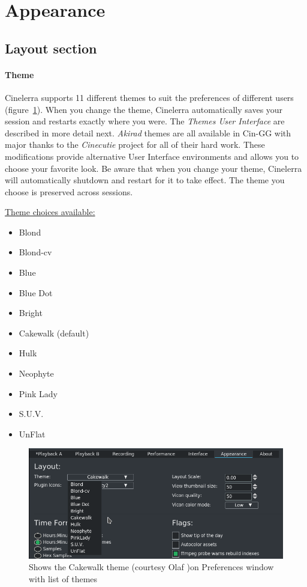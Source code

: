 \section{Appearance}%
\label{sec:appearance}

\subsection{Layout section}%
\label{sub:layout_section}

\paragraph{Theme} Cinelerra supports 11 different themes to suit the preferences of different users (figure~\ref{fig:theme}).  When you change the theme, Cinelerra automatically saves your session and restarts exactly where you were.  The \textit{Themes User Interface} are described in more detail next.  \textit{Akirad} themes are all available in Cin-GG with major thanks to the \textit{Cinecutie} project for all of their hard work. These modifications provide alternative User Interface environments and allows you to choose your favorite look.  Be aware that when you change your theme, Cinelerra will automatically shutdown and restart for it to take effect.  The theme you choose is preserved across sessions.

\underline{Theme choices available:}

\begin{itemize}[noitemsep]
    \item Blond
    \item Blond-cv
    \item Blue
    \item Blue Dot
    \item Bright
    \item Cakewalk (default)
    \item Hulk
    \item Neophyte
    \item Pink Lady
    \item S.U.V.
    \item UnFlat
\end{itemize}


\begin{figure}[htpb]
    \centering \includegraphics[width=0.9\linewidth]{images/theme.png}
    \caption{Shows the Cakewalk theme (courtesy Olaf )on Preferences window with list of themes}
    \label{fig:theme}
\end{figure}


